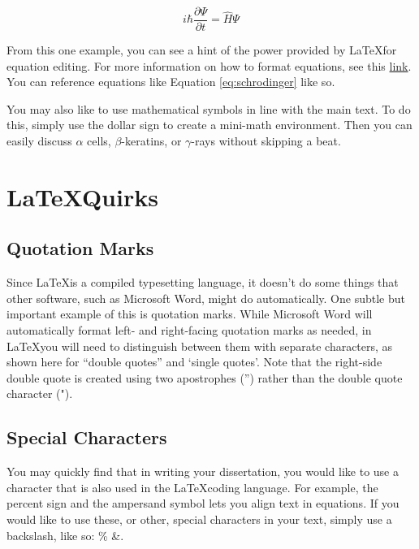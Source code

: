 \begin{equation}
    i \hbar \frac{\partial \Psi }{\partial t} = \hat{H} \Psi
    \label{eq:schrodinger}
\end{equation}

From this one example, you can see a hint of the power provided by \LaTeX for equation editing. For more information on how to format equations, see this \href{https://en.wikibooks.org/wiki/LaTeX/Mathematics}{link}. You can reference equations like Equation \eqref{eq:schrodinger} like so. 

You may also like to use mathematical symbols in line with the main text. To do this, simply use the dollar sign to create a mini-math environment. Then you can easily discuss $\alpha$ cells, $\beta$-keratins, or $\gamma$-rays without skipping a beat.

\section{\LaTeX Quirks}

\subsection{Quotation Marks}

Since \LaTeX is a compiled typesetting language, it doesn't do some things that other software, such as Microsoft Word, might do automatically. One subtle but important example of this is quotation marks. While Microsoft Word will automatically format left- and right-facing quotation marks as needed, in \LaTeX you will need to distinguish between them with separate characters, as shown here for ``double quotes'' and `single quotes'. Note that the right-side double quote is created using two apostrophes ('') rather than the double quote character ("). 

\subsection{Special Characters}

You may quickly find that in writing your dissertation, you would like to use a character that is also used in the \LaTeX coding language. For example, the percent sign %
and the ampersand symbol lets you align text in equations. If you would like to use these, or other, special characters in your text, simply use a backslash, like so: \% \&. 